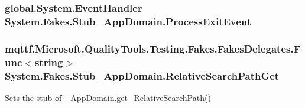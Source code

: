 \hypertarget{class_system_1_1_fakes_1_1_stub___app_domain_ab757889eabac281e0703717f1a43b202}{
\subsubsection[{Process\-Exit\-Event}]{\setlength{\rightskip}{0pt plus 5cm}global.\-System.\-Event\-Handler System.\-Fakes.\-Stub\-\_\-\-App\-Domain.\-Process\-Exit\-Event}}\label{class_system_1_1_fakes_1_1_stub___app_domain_ab757889eabac281e0703717f1a43b202}
\hypertarget{class_system_1_1_fakes_1_1_stub___app_domain_a41bbe167a67f0e955dc974e757b7e031}{
\subsubsection[{Relative\-Search\-Path\-Get}]{\setlength{\rightskip}{0pt plus 5cm}mqttf.\-Microsoft.\-Quality\-Tools.\-Testing.\-Fakes.\-Fakes\-Delegates.\-Func$<$string$>$ System.\-Fakes.\-Stub\-\_\-\-App\-Domain.\-Relative\-Search\-Path\-Get}}\label{class_system_1_1_fakes_1_1_stub___app_domain_a41bbe167a67f0e955dc974e757b7e031}


Sets the stub of \-\_\-\-App\-Domain.\-get\-\_\-\-Relative\-Search\-Path()

